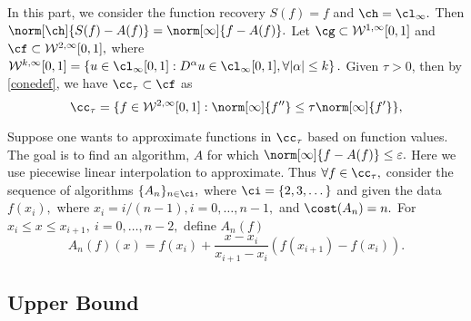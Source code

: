 
In this part, we consider the function recovery $S(f)=f$ and $\ch=\cl_{\infty}.$
Then $\norm[\ch]{S(f)-A(f)}=\norm[\infty]{f-A(f)}.$
Let $\cg \subset \mathcal{W}^{1,\infty}[0,1]$ and $\cf \subset \mathcal{W}^{2,\infty}[0,1],$ where
$\mathcal{W}^{k,\infty}[0,1]=\left\{u \in \cl_{\infty}[0,1]:D^\alpha u \in \cl_\infty[0,1], \forall |\alpha| \leq k \right\}.$
Given $\tau>0$, then by \eqref{conedef}, we have $\cc_{\tau} \subset \cf$ as
\begin{equation}\label{taudef}
\cc_{\tau}=\{f \in  \mathcal{W}^{2,\infty}[0,1] : \norm[\infty]{f''}\leq \tau\norm[\infty]{f'}\},
\end{equation}

Suppose one wants to approximate functions in $\cc_{\tau}$ based on function values.  The goal is to find an algorithm, $A$ for which $\norm[\infty]{f-A(f)} \le \varepsilon.$ Here we use piecewise linear interpolation to approximate. Thus $\forall f \in \cc_{\tau},$ consider the sequence of algorithms $\{A_n\}_{n \in \ci},$ where
$\ci=\{2,3,\dots\}$
 and given the data $f(x_i),$ where $ x_i=i/(n-1), i=0, \ldots,n-1,$ and $\cost(A_{n})=n.$
For $x_i \leq x \leq x_{i+1}, \ i=0, \ldots, n-2,$ define $A_{n}(f)$
$$A_{n}(f)(x)=f(x_{i})+\frac{x-x_i}{x_{i+1}-x_i}\left(f(x_{i+1})-f(x_i)\right).$$

\subsection{Upper Bound}




